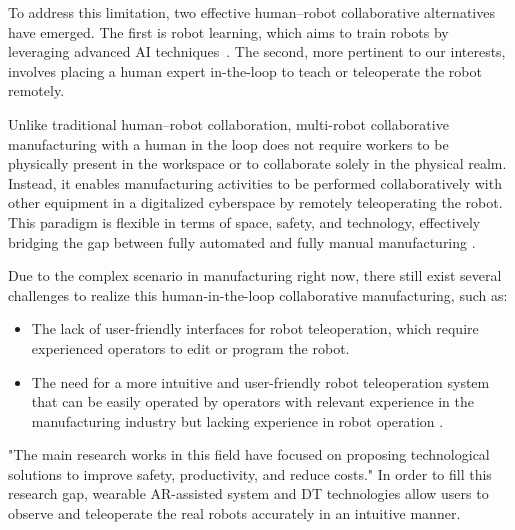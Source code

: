 \begin{enumerate}
    To address this limitation, two effective human--robot collaborative alternatives have emerged. The first is robot learning, which aims to train robots by leveraging advanced \ac{AI} techniques~\cite{6}. The second, more pertinent to our interests, involves placing a human expert in-the-loop to teach or teleoperate the robot remotely.

    
    Unlike traditional human--robot collaboration, multi-robot collaborative manufacturing with a human in the loop does not require workers to be physically present in the workspace or to collaborate solely in the physical realm. Instead, it enables manufacturing activities to be performed collaboratively with other equipment in a digitalized cyberspace by remotely teleoperating the robot. This paradigm is flexible in terms of space, safety, and technology, effectively bridging the gap between fully automated and fully manual manufacturing \cite{7}.

    
    Due to the complex scenario in manufacturing right now, there still exist several challenges to realize this human-in-the-loop collaborative manufacturing, such as:
    \begin{itemize}
        \item The lack of user-friendly interfaces for robot teleoperation, which require experienced operators to edit or program the robot.
        \item The need for a more intuitive and user-friendly robot teleoperation system that can be easily operated by operators with relevant experience in the manufacturing industry but lacking experience in robot operation \cite{9}.
    \end{itemize}

    "The main research works in this field have focused on proposing technological solutions to improve safety, productivity, and reduce costs."
    In order to fill this research gap, wearable \ac{AR}-assisted system and \ac{DT} technologies allow users to observe and teleoperate the real robots accurately in an intuitive manner. 


\end{enumerate}

